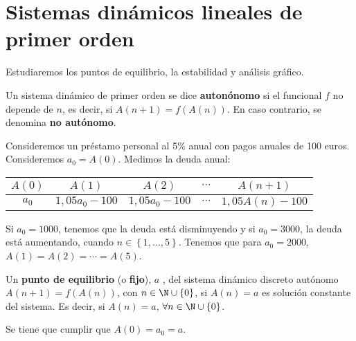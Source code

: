\section{Sistemas dinámicos lineales de primer orden}
Estudiaremos los puntos de equilibrio, la estabilidad y análisis gráfico. 
\begin{fdefinition}
\normalfont Un sistema dinámico de primer orden se dice \textbf{autonónomo} si el funcional $\displaystyle f $ no depende de $\displaystyle n $, es decir, si $\displaystyle A\left(n+1\right) = f\left(A\left(n\right)\right) $. En caso contrario, se denomina \textbf{no autónomo}.
\end{fdefinition}
\begin{eg}
\normalfont Consideremos un préstamo personal al 5\% anual con pagos anuales de 100 euros. Consideremos $\displaystyle a_{0} = A\left(0\right) $. Medimos la deuda anual:
\begin{center}
\begin{tabular}{|c|c|c|c|c|}
\hline 
$\displaystyle A\left(0\right) $ & $\displaystyle A\left(1\right) $ & $\displaystyle A\left(2\right) $ & $\displaystyle \cdots  $ & $\displaystyle A\left(n+1\right) $ \\
\hline 
$\displaystyle a_{0} $ & $\displaystyle 1,05a_{0}-100 $ & $\displaystyle 1,05a_{0}-100 $ & $\displaystyle \cdots  $ & $\displaystyle 1,05A\left(n\right)-100$ \\
\hline
\end{tabular}
\end{center}
Si $\displaystyle a_{0} = 1000 $, tenemos que la deuda está disminuyendo y si $\displaystyle a_{0} = 3000 $, la deuda está aumentando, cuando $\displaystyle n \in \left\{ 1, \ldots, 5\right\}  $. Tenemos que para $\displaystyle a_{0} = 2000 $, $\displaystyle A\left(1\right) = A\left(2\right) = \cdots = A\left(5\right) $.
\end{eg}
\begin{fdefinition}
	\normalfont Un \textbf{punto de equilibrio} (o \textbf{fijo}), $\displaystyle a $ , del sistema dinámico discreto autónomo $\displaystyle A\left(n+1\right) = f\left(A\left(n\right)\right) $, con $\displaystyle n \in \N \cup \left\{ 0\right\}  $, si $\displaystyle A\left(n\right) = a $ es solución constante del sistema. Es decir, si $\displaystyle A\left(n\right) = a $, $\displaystyle \forall n \in \N\cup \left\{ 0\right\}  $. 
\end{fdefinition}
\begin{observation}
\normalfont Se tiene que cumplir que $\displaystyle A\left(0\right) = a_{0}=a $.
\end{observation}
